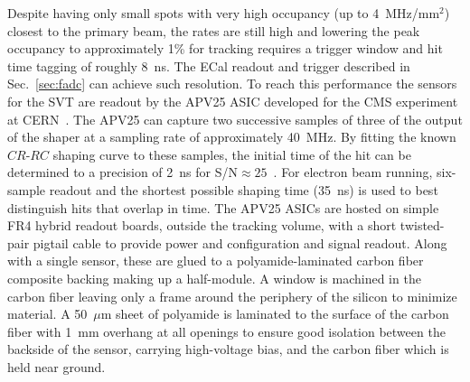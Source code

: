 \documentclass[final,3p,times,twocolumn]{elsarticle}
\begin{document}
Despite having only small spots with very high occupancy (up to 4~MHz/mm$^2$) closest to the primary 
beam, the rates are still high and lowering the peak occupancy to 
approximately 1\% for tracking requires a trigger window and hit time tagging of roughly 8~ns. The 
ECal readout and trigger described in Sec.~\ref{sec:fadc} can achieve such resolution. To reach this 
performance the sensors for the SVT are readout by the APV25 ASIC developed for the CMS 
experiment at CERN~\cite{French:2001xb}. The APV25 can capture two successive samples of three 
of the output of the shaper at a sampling rate of approximately 40~MHz.  By fitting the known 
$CR$-$RC$ shaping curve to these samples, the initial time of the hit can be determined to a precision 
of 2~ns for S/N$\approx25$~\cite{Friedl:2009zz}.  For electron beam running, six-sample readout and 
the shortest possible shaping time (35~ns) is used to best distinguish hits that overlap in time.
The APV25 ASICs are hosted on simple FR4 hybrid readout boards, outside the tracking volume, with a 
short twisted-pair pigtail cable to provide power and configuration and signal readout. Along with a 
single sensor, these are glued to a polyamide-laminated carbon fiber composite backing making 
up a half-module. A window is machined in the carbon fiber leaving only a frame around the periphery 
of the silicon to minimize material. A 50~$\mu$m sheet of polyamide is laminated to the surface of the 
carbon fiber with 1~mm overhang at all openings to ensure good isolation between the backside of the 
sensor, carrying high-voltage bias, and the carbon fiber which is held near ground. 
\end{document}
